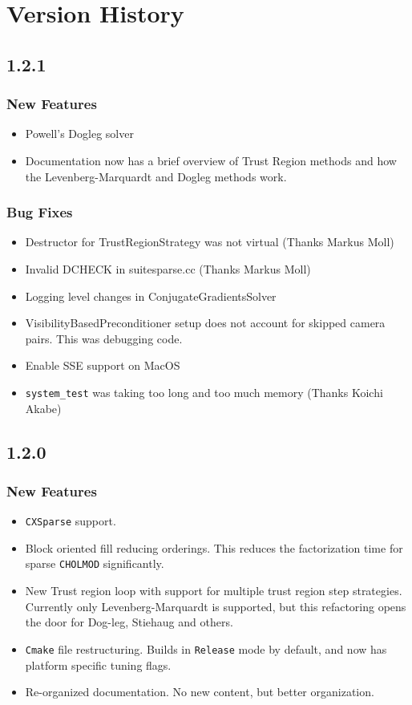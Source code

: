 
\chapter{Version History}
\section*{1.2.1}
\subsection{New Features}
\begin{itemize}
	\item Powell's Dogleg solver
	\item Documentation now has a brief overview of Trust Region methods and how the Levenberg-Marquardt and Dogleg methods work.
\end{itemize}
\subsection{Bug Fixes}
\begin{itemize}
	\item Destructor for TrustRegionStrategy was not virtual (Thanks Markus Moll)
	\item Invalid DCHECK in suitesparse.cc (Thanks Markus Moll)
	\item Logging level changes in ConjugateGradientsSolver
	\item VisibilityBasedPreconditioner setup does not account for skipped camera pairs. This was debugging code.
	\item Enable SSE support on MacOS
	\item \texttt{system\_test} was taking too long and too much memory (Thanks Koichi Akabe)
\end{itemize}
\section*{1.2.0}
\subsection{New Features}
\begin{itemize}
\item \texttt{CXSparse} support.
\item Block oriented fill reducing orderings. This
reduces the factorization time for sparse
\texttt{CHOLMOD} significantly.
\item New Trust region loop with support for multiple
trust region step strategies. Currently only Levenberg-Marquardt is supported, but this refactoring opens the door for Dog-leg, Stiehaug and others.
\item \texttt{Cmake} file restructuring.  Builds in \texttt{Release} mode by default, and now has platform specific tuning flags.
\item Re-organized documentation. No new content, but better organization.
\end{itemize}


